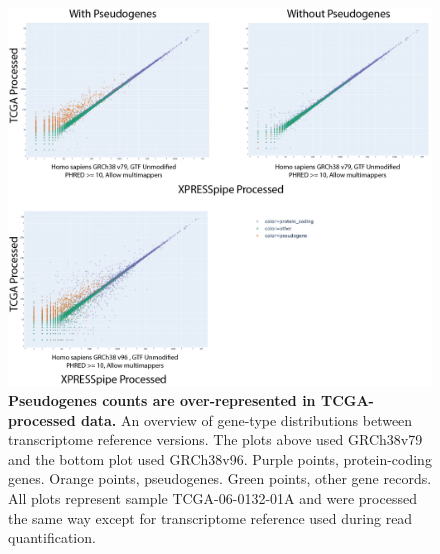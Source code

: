 \documentclass[10pt, oneside]{article}
\begin{document}
\begin{figure}
\centering
  \includegraphics[width=180mm]{figures/xpresspipe_supplement8.png}
  \caption{\textbf{Pseudogenes counts are over-represented in TCGA-processed data.} An overview of gene-type distributions between transcriptome reference versions. The plots above used GRCh38v79 and the bottom plot used GRCh38v96. Purple points, protein-coding genes. Orange points, pseudogenes. Green points, other gene records. All plots represent sample TCGA-06-0132-01A and were processed the same way except for transcriptome reference used during read quantification.}
  \label{fig:supplement8}
\end{figure}
\end{document}
